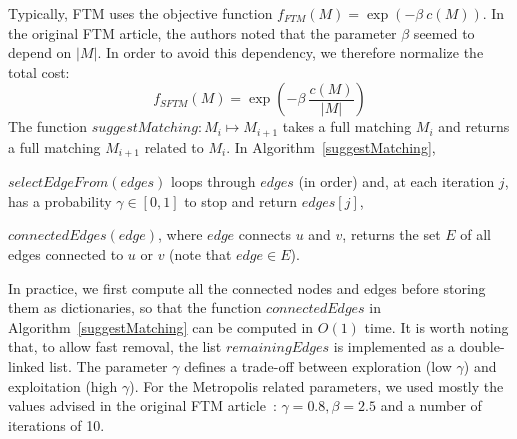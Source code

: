 Typically, FTM uses the objective function $f_{FTM}(M) = \exp(-\beta\ c(M))$.
In the original FTM article, the authors noted that the parameter $\beta$ seemed to depend on $|M|$.
In order to avoid this dependency, we therefore normalize the total cost:
\begin{equation}
	f_{SFTM}(M) = \exp(-\beta\ \frac{c(M)}{|M|})
\end{equation}
The function $suggestMatching: M_i \mapsto M_{i+1}$ takes a full matching $M_i$ and returns a full matching $M_{i+1}$ related to $M_i$.
In Algorithm~\ref{suggestMatching}, 
\begin{compactenum}
	\item $selectEdgeFrom(edges)$ loops through $edges$ (in order) and, at each iteration $j$, has a probability $\gamma \in [0,1]$ to stop and return $edges[j]$,
    \item $connectedEdges(edge)$, where $edge$ connects $u$ and $v$, returns the set $E$ of all edges connected to $u$ or $v$ (note that $edge \in E$).
\end{compactenum}


In practice, we first compute all the connected nodes and edges before storing them as dictionaries, so that the function $connectedEdges$ in Algorithm~\ref{suggestMatching} can be computed in $O(1)$ time.
It is worth noting that, to allow fast removal, the list $remainingEdges$ is implemented as a double-linked list.
The parameter $\gamma$ defines a trade-off between exploration (low $\gamma$) and exploitation (high $\gamma$).
For the Metropolis related parameters, we used mostly the values advised in the original FTM article~\cite{Kumar2011_FTM}: $\gamma = 0.8, \beta = 2.5$ and a number of iterations of 10.

